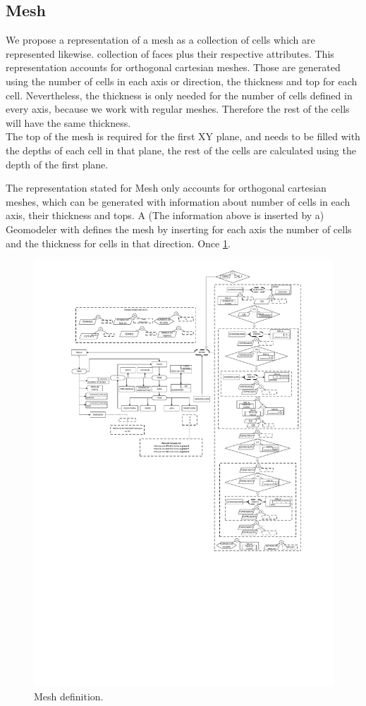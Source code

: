 \subsection{Mesh}\label{sec:PS_Mesh}

We propose a representation of a mesh as a collection of cells which are represented likewise. collection of faces plus their respective attributes. This representation accounts for orthogonal cartesian meshes. Those are generated using the number of cells in each axis or direction, the thickness and top for each cell. Nevertheless, the thickness is only needed for the number of cells defined in every axis, because we work with regular meshes. Therefore the rest of the cells will have the same thickness.
\\
The top of the mesh is required for the first XY plane, and needs to be filled with the depths of each cell in that plane, the rest of the cells are calculated using the depth of the first plane.

The representation stated for Mesh only accounts for orthogonal cartesian meshes, which can be generated with information about number of cells in each axis, their thickness and tops. A (The information above is inserted by a) Geomodeler with defines the mesh by inserting for each axis the number of cells and the thickness for cells in that direction. Once 
\ref{fig:Mesh}.\\
\begin{figure}[h]
	\centering%
	\includegraphics[width=0.9\linewidth]{Kap4/Mesh.pdf}%
	\caption{Mesh definition.} \label{fig:Mesh}
\end{figure}

